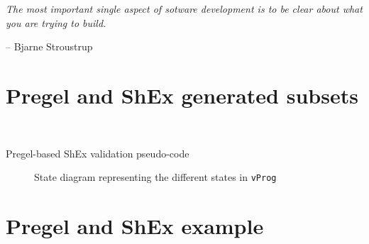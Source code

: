 \epigraph{\textit{The most important single aspect of sotware development is to be clear about what you are trying to build.}}{-- \textup{Bjarne Stroustrup}}

\section{Pregel and ShEx generated subsets}

\begin{algorithm}[!hbt]
    \DontPrintSemicolon
    \SetAlgoVlined
     \;
    \\
    \caption{Pregel-based ShEx validation pseudo-code~\cite{https://doi.org/10.48550/arxiv.2110.11709}}
    \label{alogorithm:PSchema}
\end{algorithm}

\begin{figure}[ht]
    \centering
    
    \caption[State diagram representing the different states in \texttt{vProg}]{State diagram representing the different states in \texttt{vProg}~\cite{https://doi.org/10.48550/arxiv.2110.11709}}
    \label{fig:pregelState}
\end{figure}

\section{Pregel and ShEx example}
